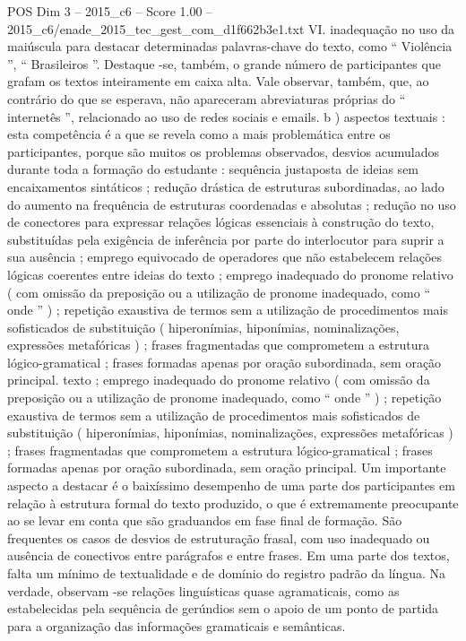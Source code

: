 \begin{textsample}{POS Dim 3 – 2015\_c6 – Score 1.00 – 2015\_c6/enade\_2015\_tec\_gest\_com\_d1f662b3e1.txt}
VI. inadequação no uso da maiúscula para destacar determinadas palavras-chave do texto, como “ Violência ”, “ Brasileiros ”.
Destaque -se, também, o grande número de participantes que grafam os textos inteiramente em caixa alta.
Vale observar, também, que, ao contrário do que se esperava, não apareceram abreviaturas próprias do “ internetês ”, relacionado ao uso de redes sociais e emails. b ) aspectos textuais : esta competência é a que se revela como a mais problemática entre os participantes, porque são muitos os problemas observados, desvios acumulados durante toda a formação do estudante : sequência justaposta de ideias sem encaixamentos sintáticos ; redução drástica de estruturas subordinadas, ao lado do aumento na frequência de estruturas coordenadas e absolutas ; redução no uso de conectores para expressar relações lógicas essenciais à construção do texto, substituídas pela exigência de inferência por parte do interlocutor para suprir a sua ausência ; emprego equivocado de operadores que não estabelecem relações lógicas coerentes entre ideias do texto ; emprego inadequado do pronome relativo ( com omissão da preposição ou a utilização de pronome inadequado, como “ onde ” ) ; repetição exaustiva de termos sem a utilização de procedimentos mais sofisticados de substituição ( hiperonímias, hiponímias, nominalizações, expressões metafóricas ) ; frases fragmentadas que comprometem a estrutura lógico-gramatical ; frases formadas apenas por oração subordinada, sem oração principal. texto ; emprego inadequado do pronome relativo ( com omissão da preposição ou a utilização de pronome inadequado, como “ onde ” ) ; repetição exaustiva de termos sem a utilização de procedimentos mais sofisticados de substituição ( hiperonímias, hiponímias, nominalizações, expressões metafóricas ) ; frases fragmentadas que comprometem a estrutura lógico-gramatical ; frases formadas apenas por oração subordinada, sem oração principal.
Um importante aspecto a destacar é o baixíssimo desempenho de uma parte dos participantes em relação à estrutura formal do texto produzido, o que é extremamente preocupante ao se levar em conta que são graduandos em fase final de formação.
São frequentes os casos de desvios de estruturação frasal, com uso inadequado ou ausência de conectivos entre parágrafos e entre frases.
Em uma parte dos textos, falta um mínimo de textualidade e de domínio do registro padrão da língua.
Na verdade, observam -se relações linguísticas quase agramaticais, como as estabelecidas pela sequência de gerúndios sem o apoio de um ponto de partida para a organização das informações gramaticais e semânticas.

\end{textsample}
